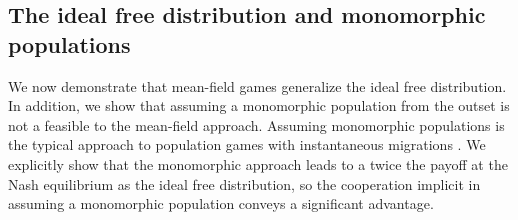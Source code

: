 \subsection{The ideal free distribution and monomorphic populations}
We now demonstrate that mean-field games generalize the ideal free distribution. In addition, we show that assuming a monomorphic population from the outset is not a feasible to the mean-field approach. Assuming monomorphic populations is the typical approach to population games with instantaneous migrations  \citep{kvrivan2013behavioral, vincent2005evolutionary}. We explicitly show that the monomorphic approach leads to a twice the payoff at the Nash equilibrium as the ideal free distribution, so the cooperation implicit in assuming a monomorphic population conveys a significant advantage.




